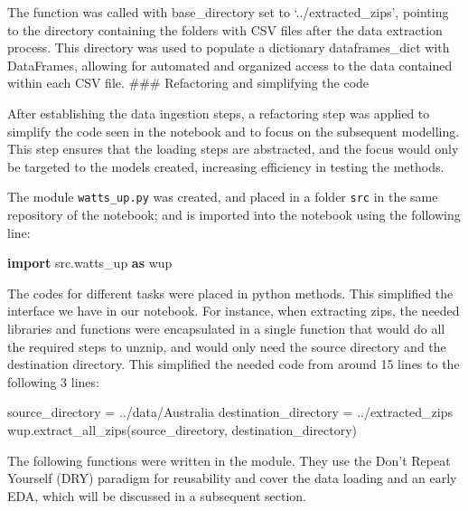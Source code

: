 \documentclass[
]{article}
\newenvironment{Shaded}{}{}
\newcommand{\ImportTok}[1]{\textcolor[rgb]{0.00,0.50,0.00}{\textbf{#1}}}
\newcommand{\NormalTok}[1]{#1}
\newcommand{\OperatorTok}[1]{\textcolor[rgb]{0.40,0.40,0.40}{#1}}
\newcommand{\StringTok}[1]{\textcolor[rgb]{0.25,0.44,0.63}{#1}}
\begin{document}
The function was called with base\_directory set to
`../extracted\_zips', pointing to the directory containing the folders
with CSV files after the data extraction process. This directory was
used to populate a dictionary dataframes\_dict with DataFrames, allowing
for automated and organized access to the data contained within each CSV
file. \#\#\# Refactoring and simplifying the code

After establishing the data ingestion steps, a refactoring step was
applied to simplify the code seen in the notebook and to focus on the
subsequent modelling. This step ensures that the loading steps are
abstracted, and the focus would only be targeted to the models created,
increasing efficiency in testing the methods.

The module \texttt{watts\_up.py} was created, and placed in a folder
\texttt{src} in the same repository of the notebook; and is imported
into the notebook using the following line:

\begin{Shaded}
\begin{Highlighting}[]
\ImportTok{import}\NormalTok{ src.watts\_up }\ImportTok{as}\NormalTok{ wup}
\end{Highlighting}
\end{Shaded}

The codes for different tasks were placed in python methods. This
simplified the interface we have in our notebook. For instance, when
extracting zips, the needed libraries and functions were encapsulated in
a single function that would do all the required steps to unznip, and
would only need the source directory and the destination directory. This
simplified the needed code from around 15 lines to the following 3
lines:

\begin{Shaded}
\begin{Highlighting}[]
\NormalTok{source\_directory }\OperatorTok{=} \StringTok{\textquotesingle{}../data/Australia\textquotesingle{}}
\NormalTok{destination\_directory }\OperatorTok{=} \StringTok{\textquotesingle{}../extracted\_zips\textquotesingle{}}
\NormalTok{wup.extract\_all\_zips(source\_directory, destination\_directory)}
\end{Highlighting}
\end{Shaded}

The following functions were written in the module. They use the Don't
Repeat Yourself (DRY) paradigm for reusability and cover the data
loading and an early EDA, which will be discussed in a subsequent
section.
\end{document}
